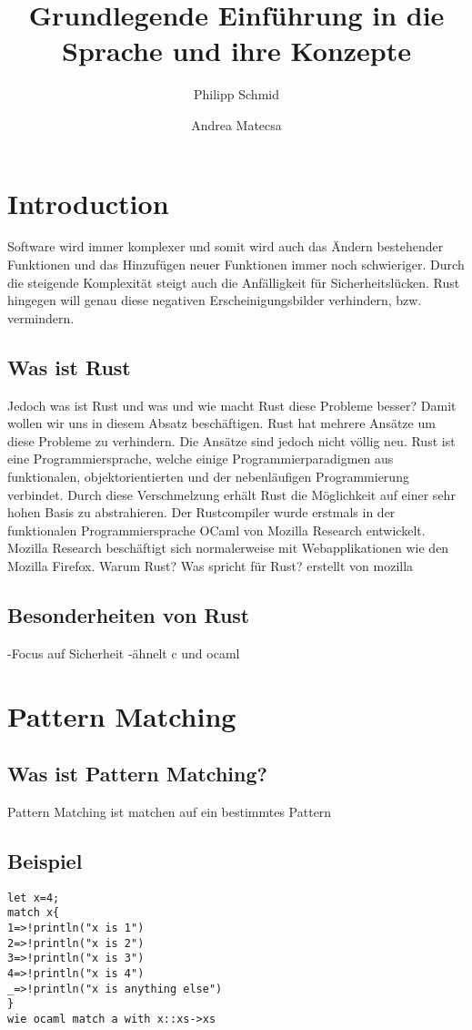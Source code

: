 \documentclass[a4paper,10pt]{scrartcl}
\title{Grundlegende Einführung in die Sprache und ihre Konzepte}
\author{Philipp Schmid \and Andrea Matecsa}
\begin{document}
\maketitle
\tableofcontents
\section{Introduction} Software wird immer komplexer und somit wird auch das Ändern bestehender Funktionen und das Hinzufügen neuer Funktionen immer noch schwieriger. Durch die steigende Komplexität steigt auch die Anfälligkeit für Sicherheitslücken. Rust hingegen will genau diese negativen Erscheinigungsbilder verhindern, bzw. vermindern. 
\subsection{Was ist Rust} Jedoch was ist Rust und was und wie macht Rust diese Probleme besser? Damit wollen wir uns in diesem Absatz beschäftigen. Rust hat mehrere Ansätze um diese Probleme zu verhindern. Die Ansätze sind jedoch nicht völlig neu. Rust ist eine Programmiersprache, welche einige Programmierparadigmen aus funktionalen, objektorientierten und der nebenläufigen Programmierung verbindet. %
Durch diese Verschmelzung erhält Rust die Möglichkeit auf einer sehr hohen Basis zu abstrahieren. Der Rustcompiler wurde erstmals in der funktionalen Programmiersprache OCaml von Mozilla Research entwickelt. Mozilla Research beschäftigt sich normalerweise mit Webapplikationen wie den Mozilla Firefox.
Warum Rust? Was spricht für Rust?
erstellt von mozilla
\subsection{Besonderheiten von Rust}
-Focus auf Sicherheit
-ähnelt c und ocaml
\section{Pattern Matching} 
\subsection{Was ist Pattern Matching?}
Pattern Matching ist matchen auf ein bestimmtes Pattern
\subsection{Beispiel}
\begin{lstlisting}
let x=4;
match x{
1=>!println("x is 1")
2=>!println("x is 2")
3=>!println("x is 3")
4=>!println("x is 4")
_=>!println("x is anything else")
}
wie ocaml match a with x::xs->xs
\end{lstlisting}
\end{document}
